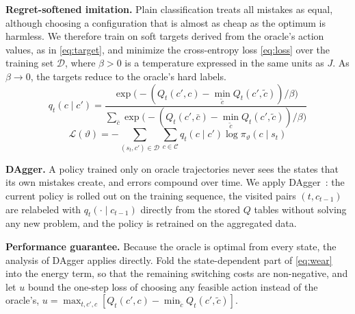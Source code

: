 \documentclass[journal]{IEEEtran}
\begin{document}
\textbf{Regret-softened imitation.} Plain classification treats all mistakes as equal, although choosing a configuration that is almost as cheap as the optimum is harmless. We therefore train on soft targets derived from the oracle's action values, as in \eqref{eq:target}, and minimize the cross-entropy loss \eqref{eq:loss} over the training set $\mathcal{D}$, where $\beta>0$ is a temperature expressed in the same units as $J$. As $\beta\to 0$, the targets reduce to the oracle's hard labels.
\begin{equation}\label{eq:target}
q_t(c\mid c')=\frac{\exp\!\big(-(Q_t(c',c)-\min_{\tilde c}Q_t(c',\tilde c))/\beta\big)}{\sum_{\bar c}\exp\!\big(-(Q_t(c',\bar c)-\min_{\tilde c}Q_t(c',\tilde c))/\beta\big)}
\end{equation}
\begin{equation}\label{eq:loss}
\mathcal{L}(\vartheta)=-\sum_{(s_t,c')\in\mathcal{D}}\sum_{c\in\mathcal{C}}q_t(c\mid c')\log\pi_\vartheta(c\mid s_t)
\end{equation}

\textbf{DAgger.} A policy trained only on oracle trajectories never sees the states that its own mistakes create, and errors compound over time. We apply DAgger~\cite{ross2011dagger}: the current policy is rolled out on the training sequence, the visited pairs $(t,c_{t-1})$ are relabeled with $q_t(\cdot\mid c_{t-1})$ directly from the stored $Q$ tables without solving any new problem, and the policy is retrained on the aggregated data.

\textbf{Performance guarantee.} Because the oracle is optimal from every state, the analysis of DAgger applies directly. Fold the state-dependent part of \eqref{eq:wear} into the energy term, so that the remaining switching costs are non-negative, and let $u$ bound the one-step loss of choosing any feasible action instead of the oracle's, $u=\max_{t,c',c}[Q_t(c',c)-\min_{\tilde c}Q_t(c',\tilde c)]$.
\end{document}
